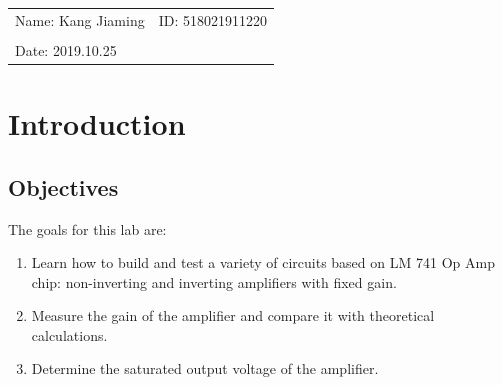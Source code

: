 \documentclass{article}
\begin{document}
\vspace*{0.25cm}

\hrulefill

\thispagestyle{empty}

\begin{center}
\begin{large}
\end{large}

\hrulefill

\vspace*{5cm}
\begin{Large}
\end{Large}

\vspace{2em}

\begin{large}
\end{large}
\end{center}
\vfill

\begin{table}[h!]
\centering
\begin{tabular}{ll}
Name: Kang Jiaming \hspace*{2em}&
ID: 518021911220\hspace*{2em}\\

\\

Date:  2019.10.25

\end{tabular}
\end{table}

\hfill
\newpage



		\section{Introduction\label{intro}}
	\subsection{Objectives}
\noindent The goals for this lab are:
\begin{enumerate}
\item Learn how to build and test a variety of circuits based on LM 741 Op Amp chip: non-inverting and inverting amplifiers with fixed gain. 
\item Measure the gain of the amplifier and compare it with theoretical calculations.
\item Determine the saturated output voltage of the amplifier.  
\end{enumerate}
\end{document}
